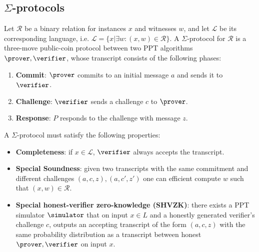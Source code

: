\subsection{$\Sigma$-protocols}\label{subsec:sigma-protocols}

Let $\mathcal{R}$ be a binary relation for instances $x$ and witnesses $w$, and let $\mathcal{L}$ be its corresponding language, i.e. $\mathcal{L} = \{ x | \exists w: (x,w) \in \mathcal{R}\}$. A $\Sigma$-protocol for $\mathcal{R}$ is a three-move public-coin protocol between two PPT algorithms $\prover,\verifier$, whose transcript consists of the following phases: 
\begin{enumerate}
    \item \textbf{Commit}: $\prover$ commits to an initial message $a$ and sends it to $\verifier$. 
    \item \textbf{Challenge}: $\verifier$ sends a challenge $c$ to $\prover$. 
    \item \textbf{Response}: $P$ responds to the challenge with message $z$.
\end{enumerate}

A $\Sigma$-protocol must satisfy the following properties:
\begin{itemize}
    \item \textbf{Completeness}: if $x \in \mathcal{L}$, $\verifier$ always accepts the transcript.
    \item \textbf{Special Soundness}: given two transcripts with the same commitment and different challenges $(a,c,z), (a,c',z')$ one can efficient compute $w$ such that $(x,w) \in \mathcal{R}$.
    \item \textbf{Special honest-verifier zero-knowledge (SHVZK)}: there exists a PPT simulator $\simulator$ that on input $x \in L$ and a honestly generated verifier's challenge $c$, outputs an accepting transcript of the form $(a, c, z)$ with the same probability distribution as a transcript between honest $\prover,\verifier$ on input $x$.
\end{itemize}

